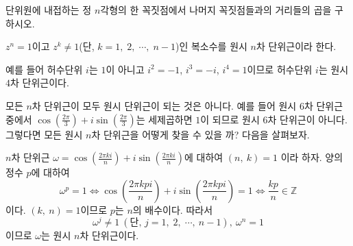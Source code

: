 \documentclass[11pt, a4paper]{book}
\begin{document}
\begin{problem}
	단위원에 내접하는 정 $n$각형의 한 꼭짓점에서 나머지 꼭짓점들과의 거리들의 곱을 구하시오.
\end{problem}
\vspace{1em}
\begin{definition}[원시 단위근]
	$z^{n}=1$이고 $z^{k}\neq 1$(단, $k=1, \;2,\; \cdots, \; n-1$)인 복소수를 {\color{red}원시 $n$차 단위근}이라 한다.
\end{definition}
예를 들어 허수단위 $i$는 $1$이 아니고 $i^{2}=-1$, $i^{3}=-i$, $i^{4}=1$이므로 허수단위 $i$는 원시 $4$차 단위근이다.

모든 $n$차 단위근이 모두 원시 단위근이 되는 것은 아니다. 예를 들어 원시 $6$차 단위근 중에서 $\cos\left(\frac{2\pi}{3}\right)+i \sin\left(\frac{2\pi}{3}\right)$는 세제곱하면 $1$이 되므로 원시 $6$차 단위근이 아니다. 그렇다면 모든 원시 $n$차 단위근을 어떻게 찾을 수 있을 까? 다음을 살펴보자.

$n$차 단위근 $\omega=\cos\left(\frac{2\pi ki}{n}\right)+ i \sin\left(\frac{2\pi ki}{n}\right)$에 대하여 $(n,\:k)=1$
이라 하자. 양의 정수 $p$에 대하여 
\begin{equation*}
\omega^{p} = 1 \Leftrightarrow \cos\left(\frac{2\pi kp i}{n}\right)+ i \sin\left(\frac{2\pi kp i}{n}\right) =1 \Leftrightarrow \frac{kp}{n} \in \mathbb{Z}
\end{equation*}
이다. $(k, \:n)=1$이므로 $p$는 $n$의 배수이다. 따라서
\[
\omega^{j} \neq 1 \: (\text{단, }j=1, \;2, \;\cdots, \:n-1), \: \omega^{n} =1
\]
이므로 $\omega$는 원시 $n$차 단위근이다.
\end{document}
